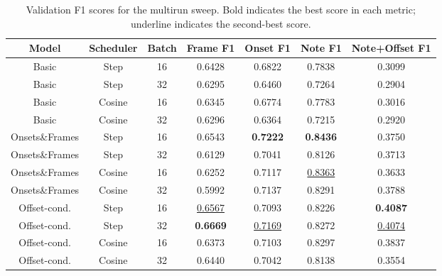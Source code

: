 \documentclass{article}
\begin{document}
\begin{table}[t]
\centering
\begin{tabular}{ccc|cccc}
\toprule
Model & Scheduler & Batch & Frame F1 & Onset F1 & Note F1 & Note+Offset F1 \\
\midrule
Basic & Step & 16 & 0.6428 & 0.6822 & 0.7838 & 0.3099 \\
Basic & Step & 32 & 0.6295 & 0.6460 & 0.7264 & 0.2904 \\
Basic & Cosine & 16 & 0.6345 & 0.6774 & 0.7783 & 0.3016 \\
Basic & Cosine & 32 & 0.6296 & 0.6364 & 0.7215 & 0.2920 \\
Onsets\&Frames & Step & 16 & 0.6543 & \textbf{0.7222} & \textbf{0.8436} & 0.3750 \\
Onsets\&Frames & Step & 32 & 0.6129 & 0.7041 & 0.8126 & 0.3713 \\
Onsets\&Frames & Cosine & 16 & 0.6252 & 0.7117 & \uline{0.8363} & 0.3633 \\
Onsets\&Frames & Cosine & 32 & 0.5992 & 0.7137 & 0.8291 & 0.3788 \\
Offset-cond. & Step & 16 & \uline{0.6567} & 0.7093 & 0.8226 & \textbf{0.4087} \\
Offset-cond. & Step & 32 & \textbf{0.6669} & \uline{0.7169} & 0.8272 & \uline{0.4074} \\
Offset-cond. & Cosine & 16 & 0.6373 & 0.7103 & 0.8297 & 0.3837 \\
Offset-cond. & Cosine & 32 & 0.6440 & 0.7042 & 0.8138 & 0.3554 \\
\bottomrule
\end{tabular}
\vspace{0.75em}
\caption{Validation F1 scores for the multirun sweep. Bold indicates the best score in each metric; underline indicates the second-best score.}
\label{tab:multirun_f1_results}
\end{table}
\end{document}
